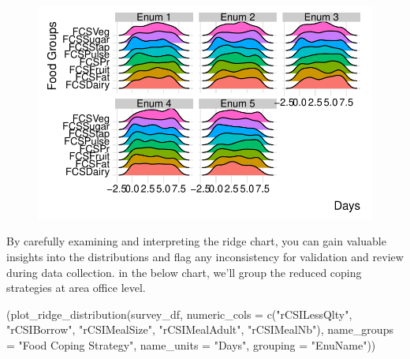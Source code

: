\documentclass[
  letterpaper,
  DIV=11,
  numbers=noendperiod]{scrreprt}
\newenvironment{Shaded}{\begin{snugshade}}{\end{snugshade}}
\newcommand{\AttributeTok}[1]{\textcolor[rgb]{0.40,0.45,0.13}{#1}}
\newcommand{\FunctionTok}[1]{\textcolor[rgb]{0.28,0.35,0.67}{#1}}
\newcommand{\NormalTok}[1]{\textcolor[rgb]{0.00,0.23,0.31}{#1}}
\newcommand{\StringTok}[1]{\textcolor[rgb]{0.13,0.47,0.30}{#1}}
\begin{document}
\begin{figure}[H]

{\centering \includegraphics{chapter_two_files/figure-pdf/unnamed-chunk-10-1.pdf}

}

\end{figure}

By carefully examining and interpreting the ridge chart, you can gain
valuable insights into the distributions and flag any inconsistency for
validation and review during data collection. in the below chart, we'll
group the reduced coping strategies at area office level.

\begin{Shaded}
\begin{Highlighting}[]
\NormalTok{(}\FunctionTok{plot\_ridge\_distribution}\NormalTok{(survey\_df, }\AttributeTok{numeric\_cols =} \FunctionTok{c}\NormalTok{(}\StringTok{"rCSILessQlty"}\NormalTok{, }\StringTok{"rCSIBorrow"}\NormalTok{, }\StringTok{"rCSIMealSize"}\NormalTok{, }\StringTok{"rCSIMealAdult"}\NormalTok{, }\StringTok{"rCSIMealNb"}\NormalTok{),}
                         \AttributeTok{name\_groups =} \StringTok{"Food Coping Strategy"}\NormalTok{, }\AttributeTok{name\_units =} \StringTok{"Days"}\NormalTok{, }\AttributeTok{grouping =} \StringTok{"EnuName"}\NormalTok{))}
\end{Highlighting}
\end{Shaded}
\end{document}
